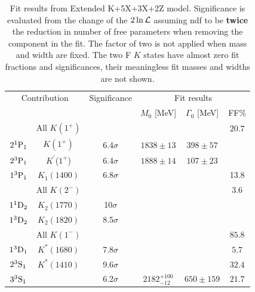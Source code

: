 \iffalse
\begin{table}[tbph]
\begin{center}
\caption{Fit results from  Extended K+5X+3X+2Z model. 
Significance is evaluated from the change of the $2\ln\mathcal{L}$ assuming ndf to be {\bf twice} the reduction in number of free parameters when removing the component in the fit. 
The factor of two is not applied when mass and width are fixed. 
The two F $K$ states have almost zero fit fractions and significances,  
their meaningless fit masses and widths are not shown. }\label{tab:fitextend}
\begin{tabular}{cccccc}
\hline
\multicolumn{2}{c}{Contribution} &Significance & \multicolumn{3}{c}{Fit results}  \\
                  &                           &                 & $M_0$ [MeV]   & $\Gamma_0$ [MeV]      & FF\%          \\
\hline \hline
  & All $K(1^+)$    &        &    &   &  $20.7$          \\
$2{}^{1}{\rm P}_{1}$   &   $K(1^+)$              & 6.4$\sigma$     &  $1838\pm 13 $   &  $398\pm 57$   &        \\
$2{}^{3}{\rm P}_{1}$   &   $K^{\prime}$($1^+$)   & 6.4$\sigma$    &  $1888\pm 14 $   &  $107\pm 23$   &     \\
$1{}^{3}{\rm P}_{1}$   &   $K_1(1400)$           & 6.8$\sigma$     &   &   &   13.8   \\
\hline
   &     All $K(2^-)$   &        &      & &  $3.6$           \\
$1{}^{1}{\rm D}_{2}$   &  $K_2 (1770)$  & 10$\sigma$       &    &     &      \\
$1{}^{3}{\rm D}_{2}$   &  $K_2(1820)$   & 8.5$\sigma$        &    &     &        \\       

\hline
& All $K(1^-)$ & & & & $85.8$ \\
$1{}^{3}{\rm D}_{1}$   & $K^*(1680)$  & 7.8$\sigma$  &    &                           & $5.7$     \\  
$2{}^{3}{\rm S}_{1}$   & $K^*(1410)$  & 9.6$\sigma$   &    &                           & $32.4$ \\
$3{}^{3}{\rm S}_{1}$   &              & 6.2$\sigma$  & $2182_{-12}^{+100} $   &   $650\pm159$  & $21.7$ \\
\hline


\end{tabular}
\end{center}
\end{table}
